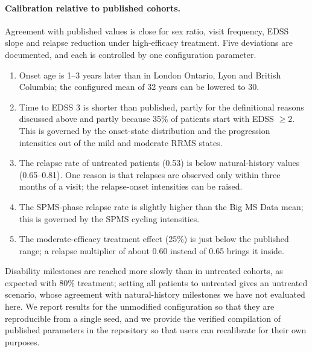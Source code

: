 \documentclass[11pt,a4paper]{article}
\begin{document}
\paragraph{Calibration relative to published cohorts.}
Agreement with published values is close for sex ratio, visit frequency, EDSS slope and relapse reduction under high-efficacy treatment. Five deviations are documented, and each is controlled by one configuration parameter.
\begin{enumerate}[leftmargin=*,itemsep=1pt,topsep=2pt]
\item Onset age is 1--3 years later than in London Ontario, Lyon and British Columbia; the configured mean of 32 years can be lowered to 30.
\item Time to EDSS 3 is shorter than published, partly for the definitional reasons discussed above and partly because 35\% of patients start with EDSS $\geq 2$. This is governed by the onset-state distribution and the progression intensities out of the mild and moderate RRMS states.
\item The relapse rate of untreated patients (0.53) is below natural-history values (0.65--0.81). One reason is that relapses are observed only within three months of a visit; the relapse-onset intensities can be raised.
\item The SPMS-phase relapse rate is slightly higher than the Big MS Data mean; this is governed by the SPMS cycling intensities.
\item The moderate-efficacy treatment effect (25\%) is just below the published range; a relapse multiplier of about 0.60 instead of 0.65 brings it inside.
\end{enumerate}
Disability milestones are reached more slowly than in untreated cohorts, as expected with 80\% treatment; setting all patients to untreated gives an untreated scenario, whose agreement with natural-history milestones we have not evaluated here. We report results for the unmodified configuration so that they are reproducible from a single seed, and we provide the verified compilation of published parameters in the repository so that users can recalibrate for their own purposes.
\end{document}
